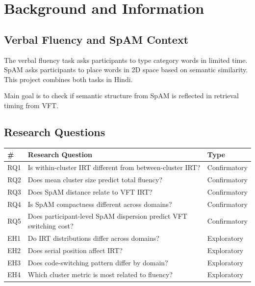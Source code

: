 \section{Background and Information}\label{background-and-information}

\subsection{Verbal Fluency and SpAM
Context}\label{verbal-fluency-and-spam-context}

The verbal fluency task asks participants to type category words in
limited time. SpAM asks participants to place words in 2D space based on
semantic similarity. This project combines both tasks in Hindi.

Main goal is to check if semantic structure from SpAM is reflected in
retrieval timing from VFT.

\subsection{Research Questions}\label{research-questions}

{\def\LTcaptype{none} %
\begin{longtable}[]{@{}
  >{\raggedright\arraybackslash}p{}
  >{\raggedright\arraybackslash}p{}
  >{\centering\arraybackslash}p{}@{}}
\toprule\noalign{}
\begin{minipage}[b]{\linewidth}\raggedright
\#
\end{minipage} & \begin{minipage}[b]{\linewidth}\raggedright
Research Question
\end{minipage} & \begin{minipage}[b]{\linewidth}\centering
Type
\end{minipage} \\
\midrule\noalign{}
\endhead
\bottomrule\noalign{}
\endlastfoot
RQ1 & Is within-cluster IRT different from between-cluster IRT? &
Confirmatory \\
RQ2 & Does mean cluster size predict total fluency? & Confirmatory \\
RQ3 & Does SpAM distance relate to VFT IRT? & Confirmatory \\
RQ4 & Is SpAM compactness different across domains? & Confirmatory \\
RQ5 & Does participant-level SpAM dispersion predict VFT switching cost?
& Confirmatory \\
EH1 & Do IRT distributions differ across domains? & Exploratory \\
EH2 & Does serial position affect IRT? & Exploratory \\
EH3 & Does code-switching pattern differ by domain? & Exploratory \\
EH4 & Which cluster metric is most related to fluency? & Exploratory \\
\end{longtable}
}

